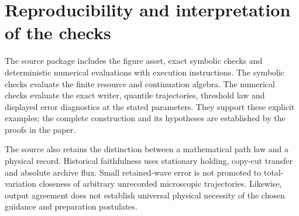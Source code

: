 \documentclass[11pt]{article}
\theoremstyle{definition}\newtheorem{assumption}[theorem]{Constitutive assumption}
\theoremstyle{remark}\newtheorem{remark}[theorem]{Remark}
\begin{document}
\section{Reproducibility and interpretation of the checks}
The source package includes the figure asset, exact symbolic checks and deterministic numerical evaluations with execution instructions. The symbolic checks evaluate the finite resource and continuation algebra. The numerical checks evaluate the exact writer, quantile trajectories, threshold law and displayed error diagnostics at the stated parameters. They support these explicit examples; the complete construction and its hypotheses are established by the proofs in the paper.

The source also retains the distinction between a mathematical path law and a physical record. Historical faithfulness uses stationary holding, copy-cut transfer and absolute archive flux. Small retained-wave error is not promoted to total-variation closeness of arbitrary unrecorded microscopic trajectories. Likewise, output agreement does not establish universal physical necessity of the chosen guidance and preparation postulates.
\end{document}
